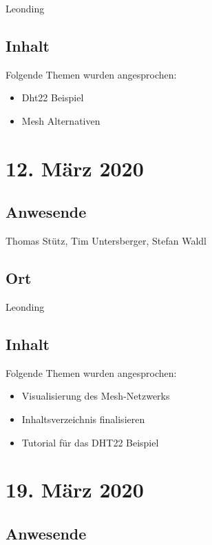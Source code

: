 Leonding

\subsection*{Inhalt}

Folgende Themen wurden angesprochen:

\begin{itemize}
  \item Dht22 Beispiel
  \item Mesh Alternativen
\end{itemize}

\pagebreak

\section*{12. März 2020}

\subsection*{Anwesende}

Thomas Stütz, Tim Untersberger, Stefan Waldl

\subsection*{Ort}

Leonding

\subsection*{Inhalt}

Folgende Themen wurden angesprochen:

\begin{itemize}
  \item Visualisierung des Mesh-Netzwerks
  \item Inhaltsverzeichnis finalisieren
  \item Tutorial für das DHT22 Beispiel 
\end{itemize}

\pagebreak

\section*{19. März 2020}

\subsection*{Anwesende}


